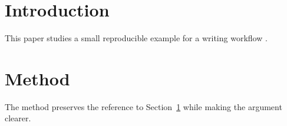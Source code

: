 \documentclass{article}
\begin{document}
\section{Introduction}
\label{sec:intro}
This paper studies a small reproducible example for a writing workflow \cite{smith2024example}.

\section{Method}
The method preserves the reference to Section~\ref{sec:intro} while making the argument clearer.
\end{document}

